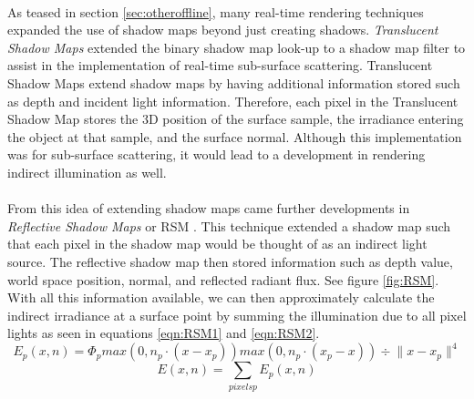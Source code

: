 \paragraph{}
As teased in section \ref{sec:otheroffline}, many real-time rendering techniques expanded the use of shadow maps beyond just creating shadows.  \textit{Translucent Shadow Maps} \cite{Dachsbacher2003} extended the binary shadow map look-up to a shadow map filter to assist in the implementation of real-time sub-surface scattering.  Translucent Shadow Maps extend shadow maps by having additional information stored such as depth and incident light information.  Therefore, each pixel in the Translucent Shadow Map stores the 3D position of the surface sample, the irradiance entering the object at that sample, and the surface normal.  Although this implementation was for sub-surface scattering, it would lead to a development in rendering indirect illumination as well.

\paragraph{}
From this idea of extending shadow maps came further developments in \textit{Reflective Shadow Maps} or RSM \cite{Dachsbacher2005}.  This technique extended a shadow map such that each pixel in the shadow map would be thought of as an indirect light source.  The reflective shadow map then stored information such as depth value, world space position, normal, and reflected radiant flux.  See figure \ref{fig:RSM}.  With all this information available, we can then approximately calculate the indirect irradiance at a surface point by summing the illumination due to all pixel lights as seen in equations \ref{eqn:RSM1} and \ref{eqn:RSM2}.
\begin{equation}
E_{p} (x,n) = \Phi_{p} {max(0, n_{p} \cdot (x-x_{p})) max(0, n_{p} \cdot (x_{p} - x))  } \div {\| x-x_{p} \|^{4} } \label{eqn:RSM1}
\end{equation}
\begin{equation}
E(x,n) = \sum_{pixels p} E_{p}(x,n) \label{eqn:RSM2}
\end{equation}

